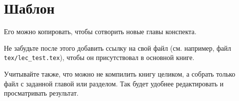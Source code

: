 \documentclass[../../main.tex]{subfiles}
\begin{document}
\section{Шаблон}

Его можно копировать, чтобы сотворить новые главы конспекта.

Не забудьте после этого добавить ссылку на свой файл (см. например, файл \texttt{tex/lec\_test.tex}), чтобы он присутствовал в основной книге.

Учитывайте также, что можно не компилить книгу целиком, а собрать только файл с заданной главой или разделом. Так будет удобнее редактировать и просматривать результат.
\end{document}
